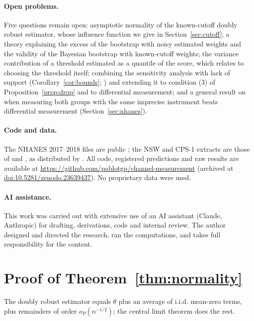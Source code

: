 \documentclass[11pt,a4paper]{article}
\theoremstyle{plain}
\theoremstyle{definition}
\begin{document}
\paragraph{Open problems.} Five questions remain open: asymptotic normality of the known-cutoff doubly robust estimator, whose influence function we give in Section~\ref{sec:cutoff}; a theory explaining the excess of the bootstrap with noisy estimated weights and the validity of the Bayesian bootstrap with known-cutoff weights; the variance contribution of a threshold estimated as a quantile of the score, which relates to choosing the threshold itself; combining the sensitivity analysis with lack of support (Corollary~\ref{cor:bounds}; \citealp{manamkoong2025}) and extending it to condition (3) of Proposition~\ref{prop:drop} and to differential measurement; and a general result on when measuring both groups with the same imprecise instrument beats differential measurement (Section~\ref{sec:nhanes}).

\paragraph{Code and data.} The NHANES 2017--2018 files are public \citep{nchs2020}; the NSW and CPS-1 extracts are those of \citet{dehejia1999} and \citet{lalonde1986}, as distributed by \citet{cunningham2021}. All code, registered predictions and raw results are available at \url{https://github.com/pablotgp/channel-measurement} (archived at \href{https://doi.org/10.5281/zenodo.23639437}{doi:10.5281/zenodo.23639437}). No proprietary data were used.

\paragraph{AI assistance.} This work was carried out with extensive use of an AI assistant (Claude, Anthropic) for drafting, derivations, code and internal review. The author designed and directed the research, ran the computations, and takes full responsibility for the content.

\appendix
\section{Proof of Theorem~\ref{thm:normality}}\label{app:proof}

The doubly robust estimator equals $\theta$ plus an average of i.i.d. mean-zero terms, plus remainders of order $o_P(n^{-1/2})$; the central limit theorem does the rest.
\end{document}
